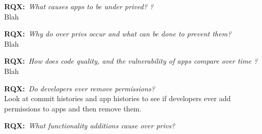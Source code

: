 \documentclass{sig-alternate}
\begin{document}
\textbf{RQX:}~\emph{What causes apps to be under prived? ?}\\
Blah


\textbf{RQX:}~\emph{Why do over privs occur and what can be done to prevent them?}\\
Blah




\textbf{RQX:}~\emph{How does code quality, and the vulnerability of apps compare over time ?}\\
Blah


\textbf{RQX:}~\emph{Do developers ever remove permissions?}\\
Look at commit histories and app histories to see if developers ever add permissions to apps and then remove them.









\textbf{RQX:}~\emph{What functionality additions cause over privs?}\\








\end{document}
